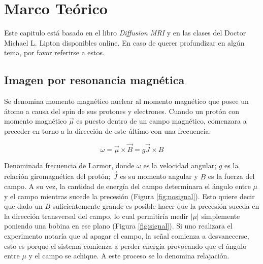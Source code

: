 \chapter{Marco Te\'orico}

Este capitulo est\'a basado en el libro \textit{Diffusion MRI} \cite{Basser2009}
y en las clases del Doctor Michael L. Lipton \cite{Lipton2014} disponibles online. 
En caso de querer profundizar en alg\'un tema, por favor referirse a estos. 

\section{Imagen por resonancia magnética}
Se denomina momento magn\'etico nuclear al momento magn\'etico que posee un 
\'atomo a causa del spin de sus protones y electrones. Cuando un prot\'on con 
momento magn\'etico $\vec{\mu}$ es puesto dentro de un campo magn\'etico, 
comenzara a preceder en torno a la direcci\'on de este \'ultimo con una 
frecuencia: 

$$ \omega = \vec{\mu} \times \vec{B} = g\vec{J} \times B $$

Denominada frecuencia de Larmor, donde $\omega$ es la velocidad angular; $g$ es
la relaci\'on giromagn\'etica del prot\'on; $\vec{J}$ es su momento angular y $B$
es la fuerza del campo. A su vez, la cantidad de energ\'ia del campo determinara
el \'angulo entre $\mu$ y el campo mientras sucede la precesi\'on
(Figura \ref{fig:nosignal}). Esto quiere decir que dado un $B$ suficientemente 
grande es posible hacer que la precesi\'on suceda en la direcci\'on transversal
del campo, lo cual permitir\'ia medir $|\mu|$ simplemente poniendo una bobina en
ese plano (Figura \ref{fig:signal}). Si uno realizara el experimento notar\'ia
que al apagar el campo, la se\~nal comienza a desvanecerse, esto es porque el
sistema comienza a perder energ\'ia provocando que el \'angulo entre $\mu$ y el
campo se achique. A este proceso se lo denomina relajaci\'on. \\

